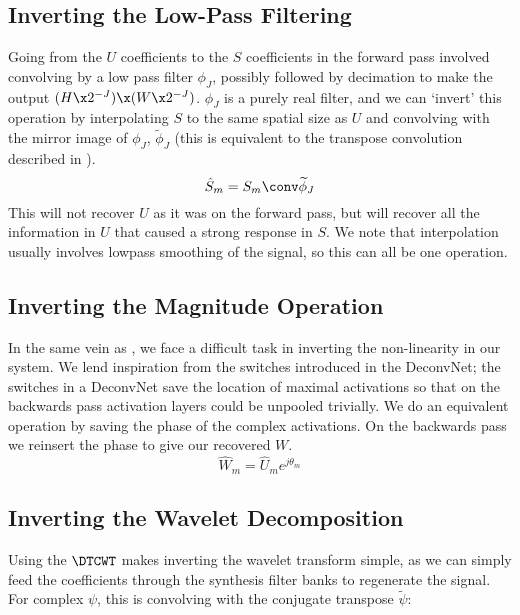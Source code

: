 \subsection{Inverting the Low-Pass Filtering}
Going from the $U$ coefficients to the $S$ coefficients in the forward pass involved convolving by
a low pass filter $\phi_J$, possibly followed by decimation to make the output $(H\x
2^{-J})\x (W\x2^{-J})$.  $\phi_J$ is a purely real filter, and we can `invert'
this operation by interpolating $S$ to the same spatial size as $U$ and convolving with
the mirror image of $\phi_J$, $\widetilde{\phi}_J$ (this is equivalent to the
transpose convolution described in \cite{zeiler_visualizing_2014}). 
\begin{equation}
  \label{eq:ch4:s_hat}
  \hat{S}_{m} = S_{m} \conv \widetilde{\phi}_J
\end{equation}
This will not recover $U$ as it was on the forward pass, but will recover all
the information in $U$ that caused a strong response in $S$. We note that
interpolation usually involves lowpass smoothing of the signal, so this can all
be one operation.

\subsection{Inverting the Magnitude Operation}
In the same vein as \cite{zeiler_visualizing_2014}, we face a difficult
task in inverting the non-linearity in our system. 
We lend inspiration from the switches introduced in the DeconvNet; the
switches in a DeconvNet save the location of maximal activations so that
on the backwards pass activation layers could be unpooled trivially. We do an
equivalent operation by saving the phase of the complex activations. On the
backwards pass we reinsert the phase to give our recovered $W$. 
\begin{equation}
  \label{eq:ch4:w_hat}
  \hat{W}_{m} = \hat{U}_{m}e^{j\theta_{m}}
\end{equation}

\subsection{Inverting the Wavelet Decomposition}
Using the $\DTCWT$ makes inverting the wavelet transform simple, as we
can simply feed the coefficients through the synthesis filter banks to regenerate
the signal. For complex $\psi$, this is convolving with the conjugate transpose
$\widetilde{\psi}$: 

